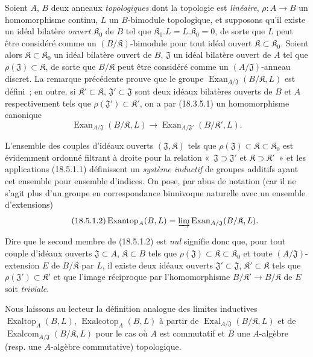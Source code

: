 \begin{env}[18.5.1]
\label{0.18.5.1-fr}
Soient $A$, $B$ deux anneaux \emph{topologiques} dont la topologie est
\emph{linéaire}, $\rho:A\to B$ un homomorphisme continu, $L$ un $B$-bimodule
topologique, et supposons qu'il existe un idéal bilatère \emph{ouvert}
$\mathfrak K_0$ de $B$ tel que
$\mathfrak K_0.L=L.\mathfrak K_0=0$, de sorte que $L$ peut être
considéré comme un $(B/\mathfrak K)$-bimodule pour tout idéal ouvert
$\mathfrak K\subset\mathfrak K_0$. Soient alors
$\mathfrak K\subset\mathfrak K_0$ un idéal bilatère ouvert de $B$,
$\mathfrak J$ un idéal bilatère ouvert de $A$ tel que
$\rho(\mathfrak J)\subset\mathfrak K$, de sorte que $B/\mathfrak K$ peut être
considéré comme un $(A/\mathfrak J)$-anneau discret. La remarque précédente
prouve que le groupe
$\operatorname{Exan}_{A/\mathfrak J}(B/\mathfrak K,L)$ est défini~; en outre,
si $\mathfrak K'\subset\mathfrak K$, $\mathfrak J'\subset\mathfrak J$ sont
deux idéaux bilatères ouverts de $B$ et $A$ respectivement tels que
$\rho(\mathfrak J')\subset\mathfrak K'$, on a par (18.3.5.1) un homomorphisme
canonique
\begin{equation}
\label{0.18.5.1.1-fr}
\tag{18.5.1.1}
  \operatorname{Exan}_{A/\mathfrak J}(B/\mathfrak K,L)
  \longrightarrow
  \operatorname{Exan}_{A/\mathfrak J'}(B/\mathfrak K',L).
\end{equation}

L'ensemble des couples d'idéaux ouverts $(\mathfrak J,\mathfrak K)$ tels que
$\rho(\mathfrak J)\subset\mathfrak K\subset\mathfrak K_0$ est évidemment
ordonné filtrant à droite pour la relation «~$\mathfrak J\supset\mathfrak J'$
et $\mathfrak K\supset\mathfrak K'$~» et les applications (18.5.1.1)
définissent un \emph{système inductif} de groupes additifs ayant cet ensemble
pour ensemble d'indices. On pose, par abus de notation (car il ne s'agit plus
d'un groupe en correspondance biunivoque naturelle avec un ensemble
d'extensions)
\begin{equation}
\label{0.18.5.1.2-fr}
\tag{18.5.1.2}
  \operatorname{Exantop}_A(B,L)
  =\varinjlim\operatorname{Exan}_{A/\mathfrak J}(B/\mathfrak K,L).
\end{equation}

Dire que le second membre de (18.5.1.2) est \emph{nul} signifie donc que, pour
tout couple d'idéaux ouverts $\mathfrak J\subset A$, $\mathfrak K\subset B$
tels que $\rho(\mathfrak J)\subset\mathfrak K\subset\mathfrak K_0$ et toute
$(A/\mathfrak J)$-extension $E$ de $B/\mathfrak K$ par $L$, il existe deux
idéaux ouverts $\mathfrak J'\subset\mathfrak J$,
$\mathfrak K'\subset\mathfrak K$ tels que
$\rho(\mathfrak J')\subset\mathfrak K'$ et que l'image réciproque par
l'homomorphisme $B/\mathfrak K'\to B/\mathfrak K$ de $E$ soit \emph{triviale}.

Nous laissons au lecteur la définition analogue des limites inductives
$\operatorname{Exaltop}_A(B,L)$, $\operatorname{Exalcotop}_A(B,L)$ à partir de
$\operatorname{Exal}_{A/\mathfrak J}(B/\mathfrak K,L)$ et de
$\operatorname{Exalcom}_{A/\mathfrak J}(B/\mathfrak K,L)$ pour le cas où $A$
est commutatif et $B$ une $A$-algèbre (resp. une $A$-algèbre commutative)
topologique.
\end{env}

